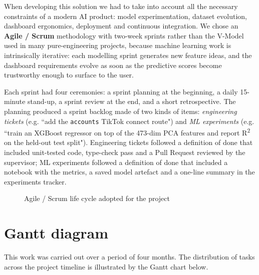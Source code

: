 When developing this solution we had to take into account all the necessary constraints of a
modern AI product: model experimentation, dataset evolution, dashboard ergonomics, deployment
and continuous integration. We chose an \textbf{Agile / Scrum} methodology with two-week
sprints rather than the V-Model used in many pure-engineering projects, because machine
learning work is intrinsically iterative: each modelling sprint generates new feature ideas,
and the dashboard requirements evolve as soon as the predictive scores become trustworthy
enough to surface to the user.

Each sprint had four ceremonies: a sprint planning at the beginning, a daily 15-minute
stand-up, a sprint review at the end, and a short retrospective. The planning produced a
sprint backlog made of two kinds of items: \emph{engineering tickets} (e.g. ``add the
\texttt{accounts} TikTok connect route") and \emph{ML experiments} (e.g. ``train an XGBoost
regressor on top of the 473-dim PCA features and report R\textsuperscript{2} on the
held-out test split"). Engineering tickets followed a definition of done that included
unit-tested code, type-check pass and a Pull Request reviewed by the supervisor; ML
experiments followed a definition of done that included a notebook with the metrics, a
saved model artefact and a one-line summary in the experiments tracker.

\begin{figure}[H]
  \centering
  \caption{Agile / Scrum life cycle adopted for the project}
  \label{fig:scrum}
\end{figure}

\section{Gantt diagram}
\label{sec:gantt}

This work was carried out over a period of four months. The distribution of tasks across the
project timeline is illustrated by the Gantt chart below.

